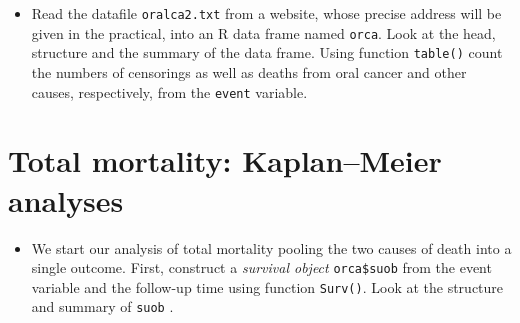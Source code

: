\documentclass[
]{book}
\newenvironment{Shaded}{\begin{snugshade}}{\end{snugshade}}
\newcommand{\AttributeTok}[1]{\textcolor[rgb]{0.13,0.29,0.53}{#1}}
\newcommand{\ConstantTok}[1]{\textcolor[rgb]{0.56,0.35,0.01}{#1}}
\newcommand{\DecValTok}[1]{\textcolor[rgb]{0.00,0.00,0.81}{#1}}
\newcommand{\FunctionTok}[1]{\textcolor[rgb]{0.13,0.29,0.53}{\textbf{#1}}}
\newcommand{\NormalTok}[1]{#1}
\newcommand{\OtherTok}[1]{\textcolor[rgb]{0.56,0.35,0.01}{#1}}
\newcommand{\SpecialCharTok}[1]{\textcolor[rgb]{0.81,0.36,0.00}{\textbf{#1}}}
\newcommand{\StringTok}[1]{\textcolor[rgb]{0.31,0.60,0.02}{#1}}
\providecommand{\tightlist}{%
  \setlength{\itemsep}{0pt}\setlength{\parskip}{0pt}}
\begin{document}
\begin{itemize}
\tightlist
\item
  Read the datafile \texttt{oralca2.txt} from a website, whose precise address
  will be given in the practical, into an R data frame named \texttt{orca}.
  Look at the head, structure and the summary of the data frame. Using
  function \texttt{table()} count the numbers of censorings as well as deaths
  from oral cancer and other causes, respectively, from the \texttt{event}
  variable.
\end{itemize}

\begin{Shaded}
\end{Shaded}

\section{Total mortality: Kaplan--Meier analyses}\label{total-mortality-kaplanmeier-analyses}

\begin{itemize}
\tightlist
\item
  We start our analysis of total mortality pooling the two causes of
  death into a single outcome. First, construct a \emph{survival object}
  \texttt{orca\$suob} from the event variable and the follow-up time using
  function \texttt{Surv()}. Look at the structure and summary of \texttt{suob} .
\end{itemize}
\end{document}
